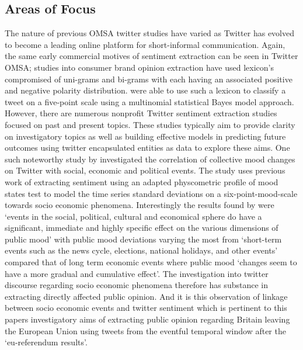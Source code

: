 \documentclass[11pt]{report}
\begin{document}
\subsection*{Areas of Focus}
The nature of previous OMSA twitter studies have varied as Twitter has evolved to become a leading online platform for short-informal communication. Again, the same early commercial motives of sentiment extraction can be seen in Twitter OMSA; studies into consumer brand opinion extraction have used lexicon's compromised of uni-grams and bi-grams with each having an associated positive and negative polarity distribution. \cite{jansen_twitter_2009} were able to use such a lexicon to classify a tweet on a five-point scale using a multinomial statistical Bayes model approach. However, there are numerous nonprofit Twitter sentiment extraction studies focused on past and present topics. These studies typically aim to provide clarity on investigatory topics as well as building effective models in predicting future outcomes using twitter encapsulated entities as data to explore these aims. One such noteworthy study by \cite{bollen_modeling_2009} investigated the correlation of collective mood changes on Twitter with social, economic and political events. The study uses previous work of extracting sentiment using an adapted physcometric profile of mood states test \citep{pepe_between_2008} to model the time series standard deviations on a six-point-mood-scale towards socio economic phenomena. Interestingly the results found by  \cite{bollen_modeling_2009} were `events in the social, political, cultural and economical sphere do have a significant, immediate and highly specific effect on the various dimensions of public mood' with public mood deviations varying the most from `short-term events such as the news cycle, elections, national holidays, and other events' compared that of long term economic events where public mood `changes seem to have a more gradual and cumulative effect'. The investigation into twitter discourse regarding socio economic phenomena therefore has substance in extracting directly affected public opinion. And it is this observation of linkage between socio economic events and twitter sentiment which is pertinent to this papers investigatory aims of extracting public opinion regarding Britain leaving the European Union using tweets from the eventful temporal window after the `eu-referendum results'. 
\end{document}
